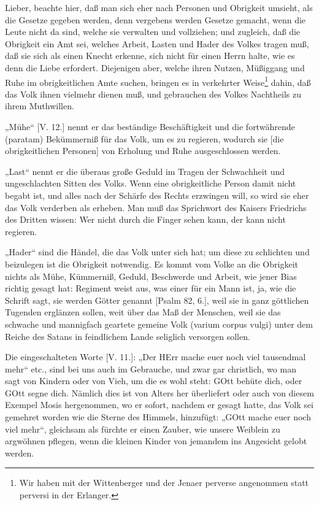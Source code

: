 Lieber, beachte hier, daß man sich eher nach Personen und Obrigkeit umsieht, als die Gesetze gegeben werden, denn vergebens werden Gesetze gemacht, wenn die Leute nicht da sind, welche sie verwalten und vollziehen; und zugleich, daß die Obrigkeit ein Amt sei, welches Arbeit, Lasten und Hader des Volkes tragen muß, daß sie sich als einen Knecht erkenne, sich nicht für einen Herrn halte, wie es denn die Liebe erfordert. Diejenigen aber, welche ihren Nutzen, Müßiggang und Ruhe im obrigkeitlichen Amte suchen, bringen es in verkehrter Weise\footnote{Wir haben mit der Wittenberger und der Jenaer perverse angenommen statt perversi in der Erlanger.} dahin, daß das Volk ihnen vielmehr dienen muß, und gebrauchen des Volkes Nachtheils zu ihrem Muthwillen.

„Mühe“ [V. 12.] nennt er das beständige Beschäftigkeit und die fortwährende (paratam) Bekümmerniß für das Volk, um es zu regieren, wodurch sie [die obrigkeitlichen Personen] von Erholung und Ruhe ausgeschlossen werden.

„Last“ nennt er die überaus große Geduld im Tragen der Schwachheit und ungeschlachten Sitten des Volks. Wenn eine obrigkeitliche Person damit nicht begabt ist, und alles nach der Schärfe des Rechts erzwingen will, so wird sie eher das Volk verderben als erheben. Man muß das Sprichwort des Kaisers Friedrichs des Dritten wissen: Wer nicht durch die Finger sehen kann, der kann nicht regieren.

„Hader“ sind die Händel, die das Volk unter
sich hat; um diese zu schlichten und beizulegen ist die Obrigkeit notwendig. Es kommt vom Volke an die Obrigkeit nichts als Mühe, Kümmerniß, Geduld, Beschwerde und Arbeit, wie jener Bias richtig gesagt hat: Regiment weist aus, was einer für ein Mann ist, ja, wie die Schrift sagt, sie werden Götter genannt [Psalm 82, 6.], weil sie in ganz göttlichen Tugenden erglänzen sollen, weit über das Maß der Menschen, weil sie das schwache und mannigfach geartete gemeine Volk (varium corpus vulgi) unter dem Reiche des Satans in feindlichem Lande seliglich versorgen sollen.

Die eingeschalteten Worte [V. 11.]: „Der HErr mache euer noch viel tausendmal mehr“ etc., sind bei uns auch im Gebrauche, und zwar gar christlich, wo man sagt von Kindern oder von Vieh, um die es wohl steht: GOtt behüte dich, oder GOtt segne dich. Nämlich dies ist von Alters her überliefert oder auch von diesem Exempel Mosis hergenommen, wo er sofort, nachdem er gesagt hatte, das Volk sei gemehret worden wie die Sterne des Himmels, hinzufügt: „GOtt mache euer noch viel mehr“, gleichsam als fürchte er einen Zauber, wie unsere Weiblein zu argwöhnen pflegen, wenn die kleinen Kinder von jemandem ins Angesicht gelobt werden.

